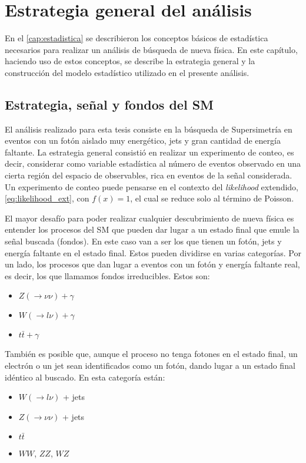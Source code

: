 \chapter{Estrategia general del análisis}
\label{cap:estrategia}

En el \cref{cap:estadistica} se describieron los conceptos básicos de estadística
necesarios para realizar un análisis de búsqueda de nueva física. En este
capítulo, haciendo uso de estos conceptos, se describe la estrategia general
y la construcción del modelo estadístico utilizado en el presente análisis.


\section{Estrategia, señal y fondos del SM}

El análisis realizado para esta tesis consiste en la búsqueda de Supersimetría en
eventos con un fotón aislado muy energético, jets y gran cantidad de energía
faltante. La estrategia general consistió en realizar un experimento de conteo,
es decir, considerar como variable estadística al número de eventos observado en
una cierta región del espacio de observables, rica en eventos de la señal considerada.
Un experimento de conteo puede
pensarse en el contexto del \emph{likelihood} extendido, \cref{eq:likelihood_ext}, con
$f(x) = 1$, el cual se reduce solo al término de Poisson.

El mayor desafío para poder realizar cualquier descubrimiento de nueva física es
entender los procesos del SM que pueden dar lugar a un estado final que emule
la señal buscada (fondos).
En este caso van a ser los que tienen un fotón, jets y energía faltante en el estado final.
Estos pueden dividirse en varias categorías.
Por un lado, los procesos que dan lugar a eventos con un fotón y energía
faltante real, es decir, los que llamamos fondos irreducibles. Estos son:

\begin{itemize}
\item $Z(\to\nu\nu)+\gamma$
\item $W(\to l\nu)+\gamma$
\item $t\bar{t}+\gamma$
\end{itemize}
%
También es posible que, aunque el proceso no tenga fotones en el estado final, un
electrón o un jet sean identificados como un fotón, dando lugar a un estado final
idéntico al buscado. En esta categoría están:

\begin{itemize}
\item $W(\to l\nu)$ + jets
\item $Z(\to \nu\nu)$ + jets
\item $t\bar{t}$
\item $WW$, $ZZ$, $WZ$
\end{itemize}

